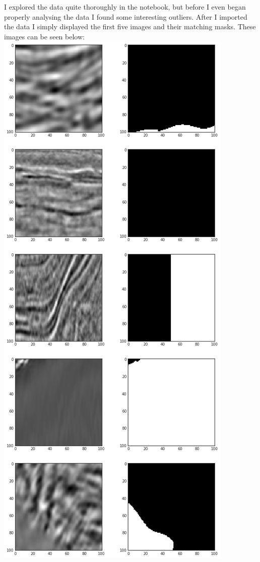 \documentclass[11pt]{article}
\makeatletter
\def\maxwidth{\ifdim\Gin@nat@width>\linewidth\linewidth
    \else\Gin@nat@width\fi}
\let\Oldincludegraphics\includegraphics
\renewcommand{\includegraphics}[1]{\Oldincludegraphics[width=.8\maxwidth]{#1}}
\makeatother
\begin{document}
I explored the data quite thoroughly in the notebook, but before I even
began properly analysing the data I found some interesting outliers.
After I imported the data I simply displayed the first five images and
their matching masks. These images can be seen below:
\includegraphics{pictures/first_five.png}
\end{document}
